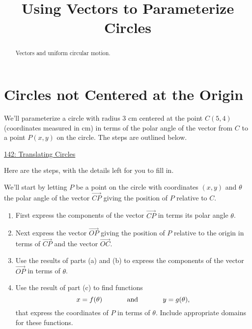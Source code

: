 \documentclass{ximera}
\title{Using Vectors to Parameterize Circles}
\begin{document}
\begin{abstract}
Vectors and uniform circular motion.
\end{abstract}
\maketitle

\section{Circles not Centered at the Origin}


\begin{question}  \label{ExKdfeKR}
We'll parameterize a circle with radius $3$ cm centered at the point $C(5,4)$ (coordinates measured in cm) in terms of the polar angle of the vector from $C$ to a point $P(x,y)$ on the circle. The steps are outlined below.

\begin{onlineOnly}
    \begin{center}
\end{center}
\end{onlineOnly}

\href{https://www.desmos.com/calculator/pcndel98wg}{142: Translating Circles}


\begin{explanation} 

Here are the steps, with the details left for you to fill in.

We'll start by letting $P$ be a point on the circle with coordinates $(x,y)$ and $\theta$ the polar angle of the vector $\overrightarrow{CP}$ giving the position of $P$ relative to $C$.

\begin{enumerate}
\item First express the components of the vector $\overrightarrow{CP}$ in terms its polar angle $\theta$.

\item Next express the vector $\overrightarrow{OP}$ giving the position of $P$ relative to the origin in terms of $\overrightarrow{CP}$ and the vector $\overrightarrow{OC}$.

\item Use the results of parts (a) and (b) to express the components of the vector $\overrightarrow{OP}$ in terms of $\theta$.

\item Use the result of part (c) to find functions
\[
    x = f(\theta)  \hskip 0.5 in \text{and} \hskip 0.5in  y=g(\theta) ,
\]
that express the coordinates of $P$ in terms of $\theta$. Include appropriate domains for these functions. 


\end{enumerate}
\end{explanation}
\end{question}
\end{document}
